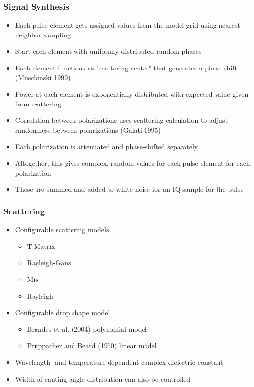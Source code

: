 \documentclass[red]{beamer}
\begin{document}
\begin{frame}
	\frametitle{Signal Synthesis}
	\begin{itemize}
		\item Each pulse element gets assigned values from the model grid using nearest
		neighbor sampling
		\item Start each element with uniformly distributed random phases
		\item Each element functions as "scattering center" that generates
		a phase shift (Muschinski 1999)
		\item Power at each element is exponentially distributed with expected value
		given from scattering 
		\item Correlation between polarizations uses scattering calculation
		to adjust randomness between polarizations (Galati 1995)
		\item Each polarization is attenuated and phase-shifted separately
		\item Altogether, this gives complex, random values for each pulse element for 
		each polarization
		\item These are summed and added to white noise for an IQ sample for the pulse
	\end{itemize}
\end{frame}

\begin{frame}
	\frametitle{Scattering}
	\begin{itemize}
		\item Configurable scattering models
		\begin{itemize}
			\item T-Matrix
			\item Rayleigh-Gans
			\item Mie
			\item Rayleigh
			\end{itemize}
		\item Configurable drop shape model
		\begin{itemize}
			\item Brandes et al. (2004) polynomial model
			\item Pruppacher and Beard (1970) linear model
			\end{itemize}
		\item Wavelength- and temperature-dependent complex dielectric constant
		\item Width of canting angle distribution can also be controlled
	\end{itemize}
\end{frame}
\end{document}
